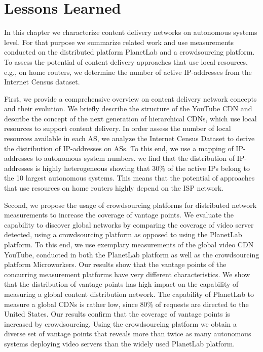 \section{Lessons Learned}\label{sec:aslevel:lessons_learned}
In this chapter we characterize content delivery networks on autonomous systems level. %
For that purpose we summarize related work and use measurements conducted on the distributed platform PlanetLab and a crowdsourcing platform.
To assess the potential of content delivery approaches that use local resources, e.g., on home routers, we determine the number of active IP-addresses from the Internet Census dataset.

First, we provide a comprehensive overview on content delivery network concepts and their evolution. We briefly describe the structure of the YouTube CDN and describe the concept of the next generation of hierarchical CDNs, which use local resources to support content delivery.
In order assess the number of local resources available in each AS, we analyze the Internet Census Dataset to derive the distribution of IP-addresses on ASs.
To this end, we use a mapping of IP-addresses to autonomous system numbers.
we find that the distribution of IP-addresses is highly heterogeneous showing that 30\% of the active IPs belong to the 10 largest autonomous systems.
This means that the potential of approaches that use resources on home routers highly depend on the ISP network.

Second, we propose the usage of crowdsourcing platforms for distributed network measurements to increase the coverage of vantage points.
We evaluate the capability to discover global networks by comparing the coverage of video server detected, using a crowdsourcing platform as opposed to using the PlanetLab platform.
To this end, we use exemplary measurements of the global video CDN YouTube, conducted in both the PlanetLab platform as well as the crowdsourcing platform Microworkers.
Our results show that the vantage points of the concurring measurement platforms have very different characteristics.
We show that the distribution of vantage points has high impact on the capability of measuring a global content distribution network.
The capability of PlanetLab to measure a global CDNs is rather low, since 80\% of requests are directed to the United States.
Our results confirm that the coverage of vantage points is increased by crowdsourcing.
Using the crowdsourcing platform we obtain a diverse set of vantage points that reveals more than twice as many autonomous systems deploying video servers than the widely used PlanetLab platform.

